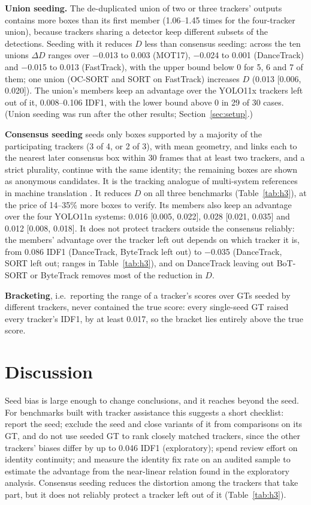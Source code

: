 \documentclass[final,times,twocolumn]{elsarticle}
\begin{document}
\textbf{Union seeding.} The de-duplicated union of two or three trackers' outputs contains more boxes than
its first member (1.06--1.45 times for the four-tracker union), because trackers sharing a detector keep
different subsets of the detections. Seeding
with it reduces $D$ less than consensus seeding: across the ten unions $\Delta D$ ranges over $-$0.013 to
0.003 (MOT17), $-$0.024 to 0.001 (DanceTrack) and $-$0.015 to 0.013 (FastTrack), with the upper bound below 0
for 5, 6 and 7 of them; one union (OC-SORT and SORT on FastTrack) increases $D$ (0.013 [0.006, 0.020]). The union's members keep an advantage over the YOLO11x trackers left out of it,
0.008--0.106 IDF1, with the lower bound above 0 in 29 of 30 cases. (Union seeding was run after the other
results; Section~\ref{sec:setup}.)

\textbf{Consensus seeding} seeds only boxes supported by a majority of the participating trackers (3 of 4,
or 2 of 3), with mean geometry, and links each to the nearest later consensus box within 30 frames that at
least two trackers, and a strict plurality, continue with the same identity; the remaining boxes are shown
as anonymous candidates. It is the tracking analogue of multi-system references in machine translation
\cite{bentivogli2018pe}. It reduces $D$ on all three benchmarks (Table~\ref{tab:h3}), at the price of 14--35\%
more boxes to verify. Its members also keep an advantage over the four YOLO11n systems: 0.016 [0.005, 0.022],
0.028 [0.021, 0.035] and 0.012 [0.008, 0.018]. It does not protect trackers outside the consensus reliably:
the members' advantage over the tracker left out depends on which tracker it is, from 0.086 IDF1
(DanceTrack, ByteTrack left out) to $-$0.035 (DanceTrack, SORT left out; ranges in Table~\ref{tab:h3}),
and on DanceTrack leaving out BoT-SORT or ByteTrack removes most of the reduction in $D$.

\textbf{Bracketing}, i.e.\ reporting the range of a tracker's scores over GTs seeded by different
trackers, never contained the true score: every single-seed GT raised every tracker's IDF1, by at least
0.017, so the bracket lies entirely above the true score.

\section{Discussion}
\label{sec:discussion}

Seed bias is large enough to change conclusions, and it reaches beyond the seed. For benchmarks built with
tracker assistance this suggests a short checklist: report the seed; exclude the seed and close variants of
it from comparisons on its GT, and do not use seeded GT to rank closely matched trackers, since the other
trackers' biases differ by up to 0.046 IDF1 (exploratory); spend review effort on identity continuity; and
measure the identity fix rate on an audited sample to estimate the advantage from the near-linear relation
found in the exploratory analysis. Consensus seeding reduces the distortion among the trackers that take
part, but it does not reliably protect a tracker left out of it (Table~\ref{tab:h3}).
\end{document}
